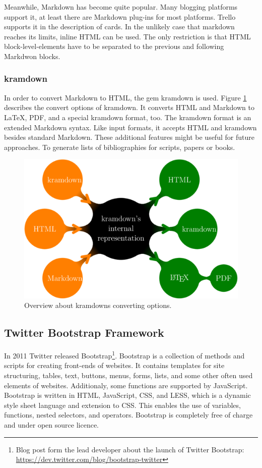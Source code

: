 Meanwhile, Markdown has become quite popular. Many blogging platforms support it, at least there are Markdown plug-ins for most platforms. Trello supports it in the description of cards. In the unlikely case that markdown reaches its limits, inline HTML can be used. The only restriction is that HTML block-level-elements have to be separated to the previous and following Markdwon blocks.

\subsubsection{kramdown}

In order to convert Markdown to HTML, the gem kramdown is used. Figure \ref{fig:kramdown} describes the convert options of kramdown. It converts HTML and Markdown to LaTeX, PDF, and a special kramdown format, too. The kramdown format is an extended Markdown syntax. Like input formats, it accepts HTML and kramdown besides standard Markdown. \cite{kramdown} These additional features might be useful for future approaches. To generate lists of bibliographies for scripts, papers or books.

\begin{figure}[htb]
\centering
\includegraphics[width=\textwidth]{figures/kramdown}
\caption{Overview about kramdowns converting options. \cite{kramdown}}
\label{fig:kramdown}
\end{figure}

\subsection{Twitter Bootstrap Framework}
In 2011 Twitter released Bootstrap\footnote{Blog post form the lead developer about the launch of Twitter Bootstrap: \url{https://dev.twitter.com/blog/bootstrap-twitter}}. Bootstrap is a collection of methods and scripts for creating front-ends of websites. It contains templates for site structuring, tables, text, buttons, menus, forms, lists, and some other often used elements of websites. Additionaly, some functions are supported by JavaScript. Bootstrap is written in HTML, JavaScript, CSS, and LESS, which is a dynamic style sheet language and extension to CSS. This enables the use of variables, functions, nested selectors, and operators.\cite{less} Bootstrap is completely free of charge and under open source licence. \cite{bootstrap}

